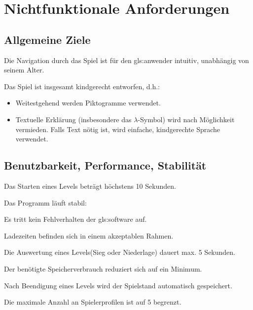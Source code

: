 \documentclass{scrartcl}
\begin{document}
\clearpage









\section{Nichtfunktionale Anforderungen}

\subsection{Allgemeine Ziele}

\begin{nflist}
    \item Die Navigation durch das Spiel ist für den \gls{gls:anwender} intuitiv, unabhängig von seinem Alter.
    \item Das Spiel ist insgesamt kindgerecht entworfen, d.h.:
    \begin{itemize}
    \item Weitestgehend werden Piktogramme verwendet.
    \item Textuelle Erklärung (insbesondere das $\lambda$-Symbol) wird nach Möglichkeit vermieden. Falls Text nötig ist, wird einfache, kindgerechte Sprache verwendet.
    \end{itemize}
\end{nflist}

\subsection{Benutzbarkeit, Performance, Stabilität}
\begin{nflist}[resume]
	\item Das Starten eines Levels beträgt höchstens 10 Sekunden. 
	\item Das Programm läuft stabil: 
	\begin{nflist}
		\item Es tritt kein Fehlverhalten der \gls{gls:software} auf.
		\item Ladezeiten befinden sich in einem akzeptablen Rahmen. 
	\end{nflist}
	\item Die Auswertung eines Levels(Sieg oder Niederlage) dauert max. 5 Sekunden.
	\item Der benötigte Speicherverbrauch reduziert sich auf ein Minimum. 
	\item Nach Beendigung eines Levels wird der Spielstand automatisch gespeichert.
	\item Die maximale Anzahl an Spielerprofilen ist auf 5 begrenzt.
\end{nflist}
\end{document}
